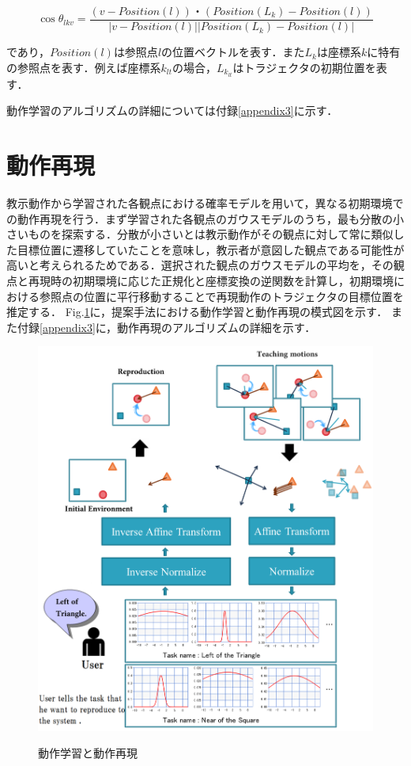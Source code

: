 \[
	\cos θ_{lkv} = \frac{(v-Position(l))・(Position(L_{k})-Position(l))}{| v-Position(l) || Position(L_{k})-Position(l) |}
\]

であり，$Position(l)$は参照点$l$の位置ベクトルを表す．また$L_{k}$は座標系$k$に特有の参照点を表す．例えば座標系$k_{lt}$の場合，$L_{k_{lt}}$はトラジェクタの初期位置を表す．


動作学習のアルゴリズムの詳細については付録\ref{appendix3}に示す．


\section{動作再現}

教示動作から学習された各観点における確率モデルを用いて，異なる初期環境での動作再現を行う．まず学習された各観点のガウスモデルのうち，最も分散の小さいものを探索する．分散が小さいとは教示動作がその観点に対して常に類似した目標位置に遷移していたことを意味し，教示者が意図した観点である可能性が高いと考えられるためである．選択された観点のガウスモデルの平均を，その観点と再現時の初期環境に応じた正規化と座標変換の逆関数を計算し，初期環境における参照点の位置に平行移動することで再現動作のトラジェクタの目標位置を推定する．
Fig.\ref{figure:learning_and_reproduction_model}に，提案手法における動作学習と動作再現の模式図を示す．
また付録\ref{appendix3}に，動作再現のアルゴリズムの詳細を示す．
	\begin{figure}[h]
		\begin{center}
			\includegraphics[width=12cm]{chart9.png} \\ %
			\caption{動作学習と動作再現}
			\label{figure:learning_and_reproduction_model}
		\end{center}
	\end{figure}
